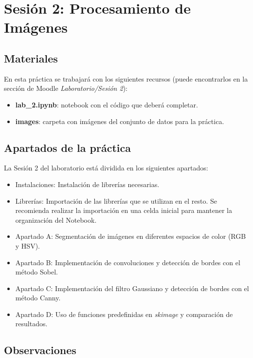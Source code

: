 \chapter{Sesión 2: Procesamiento de Imágenes}
\label{chapter:introduction_ses_2}

\section{Materiales}

En esta práctica se trabajará con los siguientes recursos (puede encontrarlos en la sección de Moodle \textit{Laboratorio/Sesión 2}):

\begin{itemize}
    \item \textbf{lab\_2.ipynb}: notebook con el código que deberá completar.
    \item \textbf{images}: carpeta con imágenes del conjunto de datos para la práctica.
\end{itemize}

\section{Apartados de la práctica}

La Sesión 2 del laboratorio está dividida en los siguientes apartados:

\begin{itemize}
    \item Instalaciones: Instalación de librerías necesarias.
    \item Librerías: Importación de las librerías que se utilizan en el resto. Se recomienda realizar la importación en una celda inicial para mantener la organización del Notebook.
    \item Apartado A: Segmentación de imágenes en diferentes espacios de color (RGB y HSV).
    \item Apartado B: Implementación de convoluciones y detección de bordes con el método Sobel.
    \item Apartado C: Implementación del filtro Gaussiano y detección de bordes con el método Canny.
    \item Apartado D: Uso de funciones predefinidas en \textit{skimage} y comparación de resultados.
\end{itemize}

\section{Observaciones}

